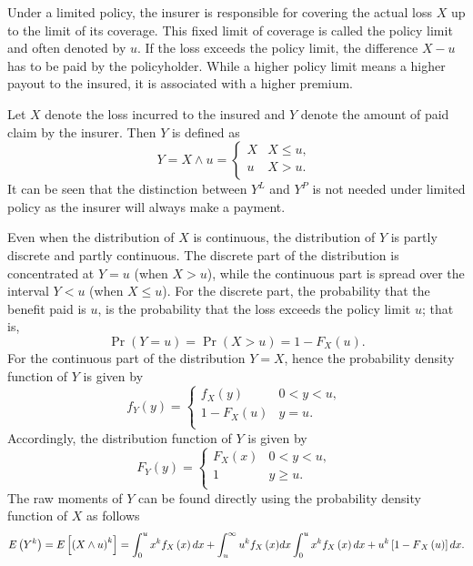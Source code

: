 \documentclass[]{book}
\begin{document}
Under a limited policy, the insurer is responsible for covering the
actual loss \(X\) up to the limit of its coverage. This fixed limit of
coverage is called the policy limit and often denoted by \(u\). If the
loss exceeds the policy limit, the difference \(X - u\) has to be paid
by the policyholder. While a higher policy limit means a higher payout
to the insured, it is associated with a higher premium.

Let \(X\) denote the loss incurred to the insured and \(Y\) denote the
amount of paid claim by the insurer. Then \(Y\) is defined as
\[Y = X \land u = \left\{ \begin{matrix}
X & X \leq u, \\
u & X > u. \\
\end{matrix} \right.\ \] It can be seen that the distinction between
\(Y^{L}\) and \(Y^{P}\) is not needed under limited policy as the
insurer will always make a payment.

Even when the distribution of \(X\) is continuous, the distribution of
\(Y\) is partly discrete and partly continuous. The discrete part of the
distribution is concentrated at \(Y = u\) (when \(X > u\)), while the
continuous part is spread over the interval \(Y < u\) (when
\(X \leq u\)). For the discrete part, the probability that the benefit
paid is \(u\), is the probability that the loss exceeds the policy limit
\(u\); that is,
\[\Pr \left( Y = u \right) = \Pr \left( X > u \right) = {1 - F}_{X}\left( u \right).\]
For the continuous part of the distribution \(Y = X\), hence the
probability density function of \(Y\) is given by
\[f_{Y}\left( y \right) = \left\{ \begin{matrix}
f_{X}\left( y \right) & 0 < y < u, \\
1 - F_{X}\left( u \right) & y = u. \\
\end{matrix} \right.\ \] Accordingly, the distribution function of \(Y\)
is given by \[F_{Y}\left( y \right) = \left\{ \begin{matrix}
F_{X}\left( x \right) & 0 < y < u, \\
1 & y \geq u. \\
\end{matrix} \right.\ \] The raw moments of \(Y\) can be found directly
using the probability density function of \(X\) as follows
\[E\left( Y^{k} \right) = E\left\lbrack \left( X \land u \right)^{k} \right\rbrack = \int_{0}^{u}x^{k}f_{X}\left( x \right)dx + \int_{u}^{\infty}{u^{k}f_{X}\left( x \right)} dx \\ \int_{0}^{u}x^{k}f_{X}\left( x \right)dx + u^{k}\left\lbrack {1 - F}_{X}\left( u \right) \right\rbrack dx.\]
\end{document}
